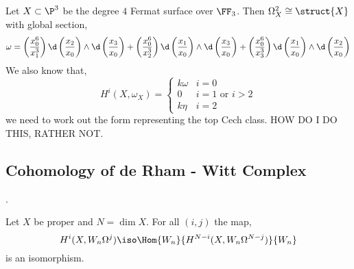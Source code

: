 \documentclass[12pt]{article}
\begin{document}
\begin{example}
Let $X \subset \P^3$ be the degree $4$ Fermat surface over $\FF_3$. Then $\Omega_X^2 \cong \struct{X}$ with global section,
\[ \omega = \left( \frac{x_0^6}{x_1^3} \right) \d \left( \frac{x_2}{x_0} \right) \wedge \d \left( \frac{x_3}{x_0} \right) + \left( \frac{x_0^6}{x_2^3} \right) \d \left( \frac{x_1}{x_0} \right) \wedge \d \left( \frac{x_3}{x_0} \right) + \left( \frac{x_0^6}{x_3^3} \right) \d \left( \frac{x_1}{x_0} \right) \wedge \d \left( \frac{x_2}{x_0} \right) \] 
We also know that,
\[ H^i(X, \omega_X) = 
\begin{cases}
k \omega & i = 0
\\
0 & i = 1 \text{ or } i > 2
\\
k \eta & i = 2
\end{cases} \]
we need to work out the form representing the top Cech class. HOW DO I DO THIS, RATHER NOT.
\end{example}

\subsection{Cohomology of de Rham - Witt Complex}

.

\begin{prop}
Let $X$ be proper and $N = \dim{X}$. For all $(i, j)$ the map,
\[ H^i(X, W_n \Omega^j) \iso \Hom{W_n}{H^{N-i}(X, W_n \Omega^{N-j})}{W_n} \]
is an isomorphism.
\end{prop}
\end{document}
